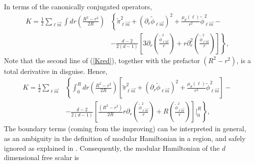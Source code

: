 \documentclass[12pt,a4paper]{article}
\begin{document}
In terms of the canonically conjugated operators,
\begin{equation}\label{Kred}
\begin{split}
K=\frac{1}{2}\sum_{\ell \vec{m}}\int dr  \left(\frac{R^2-r^2}{2 R}\right)&\left\{ \widetilde{\pi}_{\ell \vec{m}}^2+ (\partial_r \widetilde{\phi}_{\ell \vec{m}})^2+\frac{\mu_d(\ell)}{r^2} \widetilde{\phi}_{\ell \vec{m}}^2- \right.\\
& \left. -\frac{d-2}{2(d-1)}\left[3\partial_r\left(\frac{ \widetilde{\phi}_{\ell \vec{m}} ^2}{r}\right)+r\partial_r^2\left(\frac{ \widetilde{\phi}_{\ell\vec{m}} ^2}{r}\right)\right]\right\},
\end{split}
\end{equation}
Note that the second line of (\ref{Kred}), together with the prefactor $(R^2-r^2)$, is a total derivative in disguise. 
Hence,
\begin{equation}
\begin{split}
K=\frac{1}{2}\sum_{\ell \vec{m}}&\left\{\int_0^R dr  \left(\frac{R^2-r^2}{2 R}\right)\left[ \widetilde{\pi}_{\ell \vec{m}}^2+ (\partial_r \widetilde{\phi}_{\ell \vec{m}})^2+\frac{\mu_d(\ell)}{r^2} \widetilde{\phi}_{\ell \vec{m}} ^2\right]- \right.\\
& \left. -\frac{d-2}{2(d-1)}\left[\frac{(R^2-r^2)}{2R}r\partial_r\left(\frac{\widetilde{\phi}_{\ell\vec{m}}^2}{r}\right)+R \left(\frac{\widetilde{\phi}_{\ell\vec{m}}^2}{r}\right)\right]\biggr\rvert_0 ^{R}\right\},
\end{split}
\label{Kscalar}
\end{equation}
The boundary terms (coming from the improving) can be interpreted in general, as an ambiguity in the definition of modular Hamiltonian in a region,  and safely ignored as explained in \cite{Casini:2019qst}. Consequently, the modular Hamiltonian of the $d$ dimensional free scalar is
\end{document}
